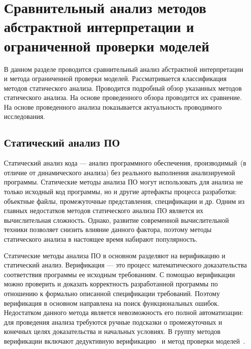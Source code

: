 \chapter{Сравнительный анализ методов абстрактной интерпретации и ограниченной 
проверки моделей}
\label{chapter:analysis}
В данном разделе проводится сравнительный анализ абстрактной интерпретации и 
метода ограниченной проверки моделей. Рассматривается классификация методов 
статического анализа. Проводится подробный обзор указанных методов статического 
анализа. На основе проведенного обзора проводится их сравнение. На основе 
проведенного анализа показывается актуальность проводимого исследования.

\section{Статический анализ ПО}
Статический анализ кода --- анализ программного обеспечения, производимый~(в 
отличие от динамического анализа) без реального выполнения анализируемой 
программы. Статические методы анализа ПО могут использовать для анализа не 
только исходный код программы, но и другие артефакты процесса разработки:
объектные файлы, промежуточные представления, спецификации и др. Одним из
главных недостатков методов статического анализа ПО является их вычислительная
сложность. Однако, развитие современной вычислительной техники позволяет
снизить влияние данного фактора, поэтому методы статического анализа в
настоящее время набирают популярность. 

Статические методы анализа ПО в основном разделяют на верификацию и статический
анализ. Верификация --- это процесс математического доказательства соответствия 
программы ее исходным требованиям. С помощью верификации можно проверить и
доказать корректность разработанной программы по отношению к формально
описанной спецификации требований. Поэтому верификация в основном направлена
на поиск функциональных ошибок. Недостатком данного метода является
невозможность его полной автоматизации: для проведения анализа требуются ручные
подсказки о промежуточных и конечных целях доказательства и начальных условиях.
В группу методов верификации включают дедуктивную верификацию~\cite{
deductiveVerification} и метод проверки моделей~\cite{modelChecking}.

